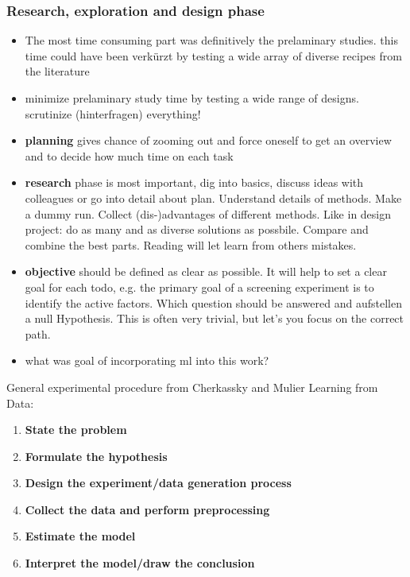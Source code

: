 \subsubsection{Research, exploration and design phase}
\begin{itemize}
    \item The most time consuming part was definitively the prelaminary studies. this time could have been verkürzt by testing a wide array of diverse recipes from the literature
    \item minimize prelaminary study time by testing a wide range of designs. scrutinize (hinterfragen) everything!
    \item \textbf{planning} gives chance of zooming out and force oneself to get an overview and to decide how much time on each task
    \item \textbf{research} phase is most important, dig into basics, discuss ideas with colleagues or go into detail about plan. Understand details of methods. Make a dummy run. Collect (dis-)advantages of different methods. Like in design project: do as many and as diverse solutions as possbile. Compare and combine the best parts. Reading will let learn from others mistakes. \\ 
    \item \textbf{objective} should be defined as clear as possible. It will help to set a clear goal for each todo, e.g. the primary goal of a screening experiment is to identify the active factors.\cite{miller2001using} Which question should be answered and aufstellen a null Hypothesis. This is often very trivial, but let's you focus on the correct path. 
    \item what was goal of incorporating ml into this work? 
\end{itemize}
General experimental procedure from Cherkassky and Mulier Learning from Data\cite{cherkassky1998learning}:
\begin{enumerate}
    \item \textbf{State the problem}
    \item \textbf{Formulate the hypothesis}
    \item \textbf{Design the experiment/data generation process}
    \item \textbf{Collect the data and perform preprocessing}
    \item \textbf{Estimate the model}
    \item \textbf{Interpret the model/draw the conclusion}
\end{enumerate}
